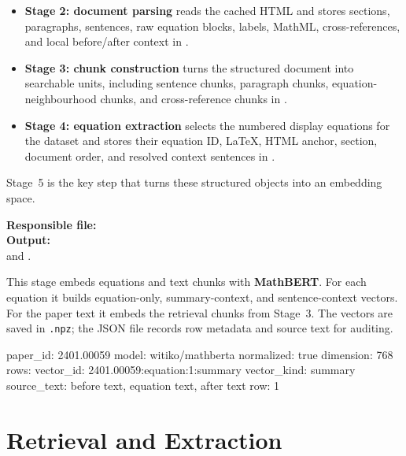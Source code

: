 \documentclass[11pt]{article}
\begin{document}
\begin{itemize}
  \item \textbf{Stage 2: document parsing}
        reads the cached HTML and stores sections, paragraphs,
        sentences, raw equation blocks, labels, MathML, cross-references,
        and local before/after context in
        .
  \item \textbf{Stage 3: chunk construction}
        turns the structured document into searchable units, including
        sentence chunks, paragraph chunks, equation-neighbourhood chunks,
        and cross-reference chunks in
        .
  \item \textbf{Stage 4: equation extraction}
        selects the numbered display equations for the dataset and
        stores their equation ID, \LaTeX{}, HTML anchor, section,
        document order, and resolved context sentences in
        .
\end{itemize}

Stage~5 is the key step that turns these structured objects into an
embedding space.

\noindent\textbf{Responsible file:}
\\
\textbf{Output:}
\\
and .

This stage embeds equations and text chunks with \textbf{MathBERT}.
For each equation it builds equation-only, summary-context, and
sentence-context vectors.
For the paper text it embeds the retrieval chunks from Stage~3.
The vectors are saved in \texttt{.npz}; the JSON file records row
metadata and source text for auditing.

\begin{CodeSnippet}
paper_id: 2401.00059
model: witiko/mathberta
normalized: true
dimension: 768
rows:
  vector_id: 2401.00059:equation:1:summary
  vector_kind: summary
  source_text: before text, equation text, after text
  row: 1
\end{CodeSnippet}


\section{Retrieval and Extraction}
\end{document}
